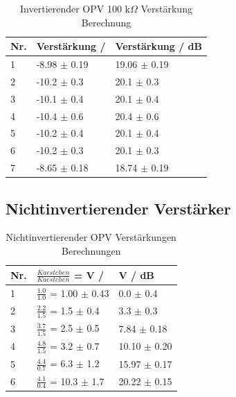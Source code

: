 \documentclass[12pt,a4paper,twoside]{article}
\begin{document}
\begin{table}[H]
    \centering
    \caption{Invertierender OPV 100 k$\Omega$ Verstärkung Berechnung}
    \label{tab:IoVerstärkungenBerechnet100AW}
    \begin{tabular}{| l | l | l |}
        \hline
        Nr. & Verstärkung / & Verstärkung / dB \\
        \hline
        1 & -8.98 $\pm$ 0.19 & 19.06 $\pm$ 0.19 \\
        2 & -10.2 $\pm$ 0.3 & 20.1 $\pm$ 0.3 \\
        3 & -10.1 $\pm$ 0.4 & 20.1 $\pm$ 0.4 \\
        4 & -10.4 $\pm$ 0.6 & 20.4 $\pm$ 0.6 \\
        5 & -10.2 $\pm$ 0.4 & 20.1 $\pm$ 0.4 \\
        6 & -10.2 $\pm$ 0.3 & 20.1 $\pm$ 0.3 \\
        7 & -8.65 $\pm$ 0.18 & 18.74 $\pm$ 0.19 \\
        \hline
    \end{tabular}
\end{table}

\subsection{Nichtinvertierender Verstärker}

\begin{table}[H]
    \centering
    \caption{Nichtinvertierender OPV Verstärkungen Berechnungen}
    \label{tab:NioVerstärkungenBerechnetAW}
    \begin{tabular}{| l | l | l |}
        \hline
        Nr. & $\frac{Kaestchen}{Kaestchen}$ = V / & V / dB \\
        \hline
        1 & $\frac{1.0}{1.0}$ =  1.00 $\pm$ 0.43 & 0.0    $\pm$ 0.4 \\
        2 & $\frac{2.2}{1.5}$ =  1.5 $\pm$ 0.4 & 3.3 $\pm$ 0.3 \\
        3 & $\frac{3.7}{1.5}$ =  2.5 $\pm$ 0.5 & 7.84 $\pm$ 0.18 \\
        4 & $\frac{4.8}{1.5}$ =  3.2 $\pm$ 0.7 & 10.10 $\pm$ 0.20 \\
        5 & $\frac{4.4}{0.7}$ =  6.3 $\pm$ 1.2 & 15.97 $\pm$ 0.17 \\
        6 & $\frac{4.1}{0.4}$ = 10.3 $\pm$ 1.7 & 20.22 $\pm$ 0.15 \\
        \hline
    \end{tabular}
\end{table}
\end{document}
